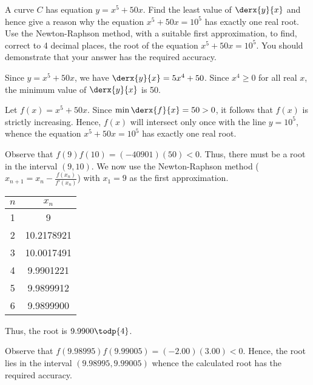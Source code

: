 \begin{problem}
    A curve $C$ has equation $y = x^5 + 50x$. Find the least value of $\derx{y}{x}$ and hence give a reason why the equation $x^5+50x=10^5$ has exactly one real root. Use the Newton-Raphson method, with a suitable first approximation, to find, correct to 4 decimal places, the root of the equation $x^5+50x=10^5$. You should demonstrate that your answer has the required accuracy.
\end{problem}
\begin{solution}
    Since $y = x^5 + 50x$, we have $\derx{y}{x} = 5x^4 + 50$. Since $x^4 \geq 0$ for all real $x$, the minimum value of $\derx{y}{x}$ is 50.

    Let $f(x) = x^5 + 50x$. Since $\min \derx{f}{x} = 50 > 0$, it follows that $f(x)$ is strictly increasing. Hence, $f(x)$ will intersect only once with the line $y = 10^5$, whence the equation $x^5 + 50x = 10^5$ has exactly one real root.

    Observe that $f(9)f(10) = (-40901)(50) < 0$. Thus, there must be a root in the interval $(9, 10)$. We now use the Newton-Raphson method ($x_{n+1} = x_n - \frac{f(x_n)}{f'(x_n)}$) with $x_1 = 9$ as the first approximation.
    \begin{table}[H]
        \centering
        \begin{tabular}{|c|c|}
        \hline
        $n$ & $x_n$ \\ \hline
        1 & 9 \\ \hline
        2 & 10.2178921 \\ \hline
        3 & 10.0017491 \\ \hline
        4 & 9.9901221 \\ \hline
        5 & 9.9899912 \\ \hline
        6 & 9.9899900 \\ \hline
        \end{tabular}
    \end{table}
    Thus, the root is $9.9900 \todp{4}$.

    Observe that $f(9.98995)f(9.99005) = (-2.00)(3.00) < 0$. Hence, the root lies in the interval $(9.98995, 9.99005)$ whence the calculated root has the required accuracy.
\end{solution}

